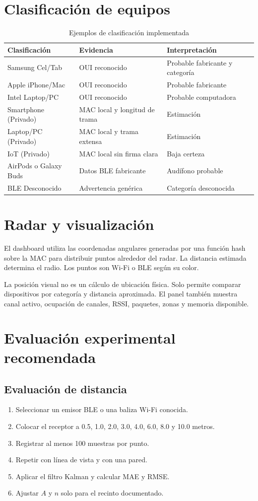 \documentclass[12pt,a4paper]{article}
\begin{document}
\section{Clasificación de equipos}
\begin{table}[htbp]
\centering
\centering
\caption{Ejemplos de clasificación implementada}
\begin{tabularx}{\textwidth}{@{}p{3.1cm}p{4.2cm}X@{}}
\toprule
Clasificación & Evidencia & Interpretación \\
\midrule
Samsung Cel/Tab & OUI reconocido & Probable fabricante y categoría \\
Apple iPhone/Mac & OUI reconocido & Probable fabricante \\
Intel Laptop/PC & OUI reconocido & Probable computadora \\
Smartphone (Privado) & MAC local y longitud de trama & Estimación \\
Laptop/PC (Privado) & MAC local y trama extensa & Estimación \\
IoT (Privado) & MAC local sin firma clara & Baja certeza \\
AirPods o Galaxy Buds & Datos BLE fabricante & Audífono probable \\
BLE Desconocido & Advertencia genérica & Categoría desconocida \\
\bottomrule
\end{tabularx}
\end{table}

\section{Radar y visualización}
El dashboard utiliza las coordenadas angulares generadas por una función hash sobre la MAC para distribuir puntos alrededor del radar. La distancia estimada determina el radio. Los puntos son Wi-Fi o BLE según su color.

La posición visual no es un cálculo de ubicación física. Solo permite comparar dispositivos por categoría y distancia aproximada. El panel también muestra canal activo, ocupación de canales, RSSI, paquetes, zonas y memoria disponible.

\section{Evaluación experimental recomendada}
\subsection{Evaluación de distancia}
\begin{enumerate}
\item Seleccionar un emisor BLE o una baliza Wi-Fi conocida.
\item Colocar el receptor a 0.5, 1.0, 2.0, 3.0, 4.0, 6.0, 8.0 y 10.0 metros.
\item Registrar al menos 100 muestras por punto.
\item Repetir con línea de vista y con una pared.
\item Aplicar el filtro Kalman y calcular MAE y RMSE.
\item Ajustar $A$ y $n$ solo para el recinto documentado.
\end{enumerate}
\end{document}
